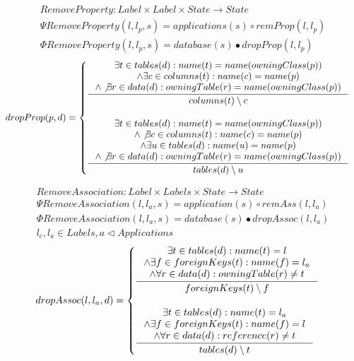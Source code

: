 \documentclass[11pt]{article}
\begin{document}
\begin{align*}
RemoveProperty: Label \times Label \times State \rightarrow State \\
\Psi RemoveProperty(l, l_p, s) =  applications(s) \circ  remProp(l, l_p) \\
\Phi RemoveProperty(l, l_p, s) =  database(s) \bullet dropProp(l, l_p) \end{align*}
\begin{align*}
dropProp(p, d) = \begin{cases}
 \inference{ \exists t \in tables(d) : name(t) = name(owningClass(p)) \\ \wedge \exists c \in columns(t) : name(c) = name(p) \\ \wedge \not \exists r \in data(d) : owningTable(r) = name(owningClass(p)) }{columns(t) \setminus c
} \\ \\
  \inference{ \exists t \in tables(d) : name(t) = name(owningClass(p)) \\ \wedge \not \exists c \in columns(t) : name(c) = name(p) \\ \wedge \exists u \in tables(d) : name(u) = name(p) \\ \wedge \not \exists r \in data(d) : owningTable(r) = name(owningClass(p))}{ tables(d) \setminus u }
 \end{cases}
\end{align*}

\begin{align*}
RemoveAssociation : Label \times Labels \times State \rightarrow State \\ 
\Psi RemoveAssociation(l, l_a, s) = application(s) \circ remAss(l, l_a) \\
\Phi RemoveAssociation(l, l_a, s) = database(s) \bullet dropAssoc(l, l_a) \\
l_c, l_a \in Labels, a \lhd Applications
\end{align*}
\begin{align*}
dropAssoc(l, l_a, d) =  \begin{cases}
 \inference{\exists t \in tables(d) : name(t) = l
 \\ \wedge \exists f \in foreignKeys(t) : name(f) = l_a
 \\ \wedge \forall r \in data(d) : owningTable(r) \neq t}{ foreignKeys(t) \setminus f }
 \\ \\
 \inference{\exists t \in tables(d) : name(t) = l_a
 \\ \wedge \exists f \in foreignKeys(t) : name(f) = l
 \\ \wedge \forall r \in data(d) : reference(r) \neq t}{ tables(d) \setminus t}
 \end{cases}
\end{align*}
\end{document}
